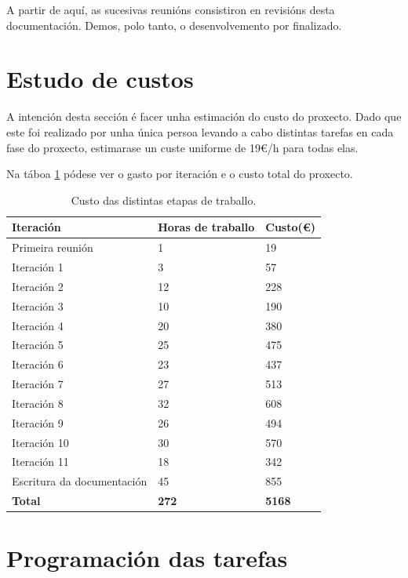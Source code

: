 A partir de aquí, as sucesivas reunións consistiron en revisións desta documentación. Demos, polo tanto, o desenvolvemento por finalizado.



\section{Estudo de custos}

A intención desta sección é facer unha estimación do custo do proxecto. Dado que este foi realizado por unha única persoa levando a cabo distintas tarefas en cada fase do proxecto, estimarase un custe uniforme de 19€/h para todas elas. 

Na táboa \ref{tab:custo} pódese ver o gasto por iteración e o custo total do proxecto.

\begin{table}[h]
	\centering
	\begin{tabular}{|p{5cm}|l|l|}
		\hline
		\rowcolor{blue!10}
		Iteración & Horas de traballo & Custo(€)\\
		\hline
		Primeira reunión & 1 &  19\\
		\hline
		Iteración 1 & 3 &  57\\
		\hline
		Iteración 2 & 12 &  228\\
		\hline
		Iteración 3 & 10 &  190\\
		\hline
		Iteración 4 & 20 &  380\\
		\hline
		Iteración 5 & 25 &  475\\
		\hline
		Iteración 6 & 23 &  437\\
		\hline
		Iteración 7 & 27 &  513\\
		\hline
		Iteración 8 & 32 &  608\\
		\hline
		Iteración 9 & 26 &  494\\
		\hline
		Iteración 10 & 30 &  570\\
		\hline
		Iteración 11 &  18 &  342\\
		\hline
		Escritura da documentación & 45 & 855\\
		\hline
		\textbf{Total} & \textbf{272} & \textbf{5168} \\
		\hline
	\end{tabular}
	\caption{Custo das distintas etapas de traballo.}
\label{tab:custo}
\end{table}


\section{Programación das tarefas}


